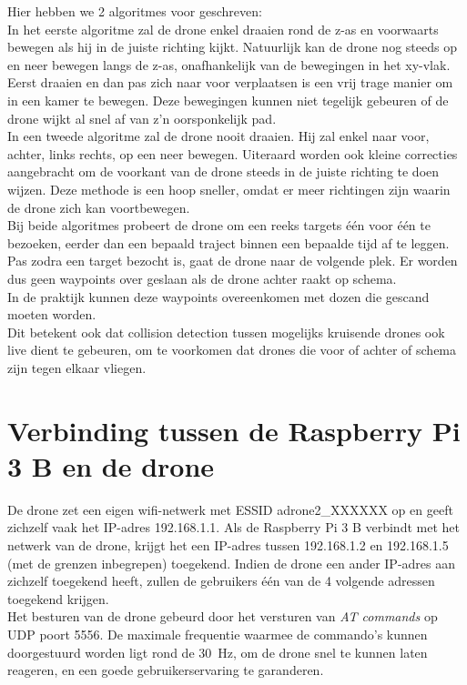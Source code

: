 Hier hebben we 2 algoritmes voor geschreven:\\
In het eerste algoritme zal de drone enkel draaien rond de z-as en voorwaarts bewegen als hij in de juiste richting kijkt.
Natuurlijk kan de drone nog steeds op en neer bewegen langs de z-as, onafhankelijk van de bewegingen in het xy-vlak.
Eerst draaien en dan pas zich naar voor verplaatsen is een vrij trage manier om in een kamer te bewegen.
Deze bewegingen kunnen niet tegelijk gebeuren of de drone wijkt al snel af van z'n oorsponkelijk pad.\\
In een tweede algoritme zal de drone nooit draaien.
Hij zal enkel naar voor, achter, links rechts, op een neer bewegen.
Uiteraard worden ook kleine correcties aangebracht om de voorkant van de drone steeds in de juiste richting te doen wijzen.
Deze methode is een hoop sneller, omdat er meer richtingen zijn waarin de drone zich kan voortbewegen.\\

Bij beide algoritmes probeert de drone om een reeks targets \'e\'en voor \'e\'en te bezoeken, eerder dan een bepaald traject binnen een bepaalde tijd af te leggen.
Pas zodra een target bezocht is, gaat de drone naar de volgende plek.
Er worden dus geen waypoints over geslaan als de drone achter raakt op schema.\\
In de praktijk kunnen deze waypoints overeenkomen met dozen die gescand moeten worden.\\
Dit betekent ook dat collision detection tussen mogelijks kruisende drones ook live dient te gebeuren, om te voorkomen dat drones die voor of achter of schema zijn tegen elkaar vliegen.

\section{Verbinding tussen de Raspberry Pi 3 B en de drone} \label{sec:raspberry_drone}
De drone zet een eigen wifi-netwerk met ESSID adrone2\_XXXXXX  op en geeft zichzelf vaak het IP-adres 192.168.1.1.
Als de Raspberry Pi 3 B verbindt met het netwerk van de drone, krijgt het een IP-adres tussen 192.168.1.2 en 192.168.1.5 (met de grenzen inbegrepen) toegekend.
Indien de drone een ander IP-adres aan zichzelf toegekend heeft, zullen de gebruikers één van de 4 volgende adressen toegekend krijgen.\\
Het besturen van de drone gebeurd door het versturen van \textit{AT commands} op UDP poort 5556.
De maximale frequentie waarmee de commando's kunnen doorgestuurd worden ligt rond de \SI{30}{\Hz}, om de drone snel te kunnen laten reageren, en een goede gebruikerservaring te garanderen.\\

